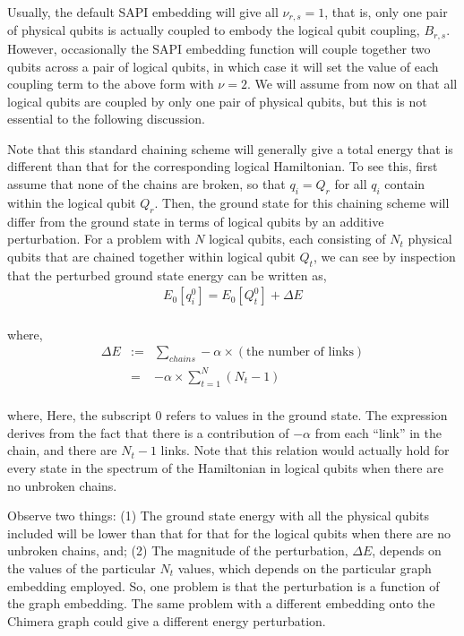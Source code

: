 \documentclass[preprint,12pt,eqsecnum,nofootinbib,amsmath,amssymb]{revtex4}
\begin{document}
Usually, the default SAPI embedding will give all $\nu_{r,s}=1$, that is, only one
pair of physical qubits is actually coupled to embody the logical qubit coupling, $B_{r,s}$.
However, occasionally the SAPI embedding function will couple together two qubits
across a pair of logical qubits, in which case it will set the value of each 
coupling term to the above form with $\nu=2$. We will assume from now on that all
logical qubits are coupled by only one pair of physical qubits, but this is not
essential to the following discussion.

Note that this standard chaining scheme will generally give a total energy that
is different than that for the corresponding logical Hamiltonian. To see this, first assume that none
of the chains are broken, so that $q_i = Q_r$ for all $q_i$ contain within the logical qubit $Q_r$.
Then, the ground state for this chaining scheme will differ from the ground state 
in terms of logical qubits by an additive perturbation.  For a problem with $N$ logical
qubits, each consisting of $N_t$ physical qubits that are chained together within logical qubit $Q_t$, 
we can see by inspection that the perturbed ground state energy can be written as,
%
\begin{eqnarray}
  E_0[q^0_i] = E_0[Q^0_t] + \Delta E
\end{eqnarray}\\
%
where,
%
\begin{eqnarray}
  \Delta E &:=& \sum_{chains} -\alpha \times (\mbox{the number of links}) \\
           &=& -\alpha \times \sum_{t=1}^N (N_t-1)
  \label{perturbation}
\end{eqnarray}\\
%
where,
Here, the subscript $0$ refers to values in the ground state.  The expression derives 
from the fact that there is a contribution of $-\alpha$ from each ``link'' in the 
chain, and there are $N_t-1$ links.  Note that this relation would actually
hold for every state in the spectrum of the Hamiltonian in logical qubits when there are no
unbroken chains.

Observe two things: (1) The ground state energy with all the physical qubits included will 
be lower than that for that for the logical qubits when there are no unbroken chains, and;
(2) The magnitude of the perturbation, $\Delta E$, depends on the values of the particular
$N_t$ values, which depends on the particular graph embedding employed. So, one problem is that
the perturbation is a function of the graph embedding. The same problem with a different embedding
onto the Chimera graph could give a different energy perturbation.
\end{document}
